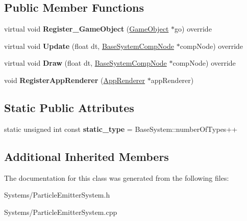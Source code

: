 \subsection*{Public Member Functions}
\begin{DoxyCompactItemize}
\item 
\mbox{\label{classParticleEmitterSystem_af96ef720b35ac0f5c3b64d7ecfdd7981}} 
virtual void {\bfseries Register\+\_\+\+Game\+Object} (\hyperlink{classGameObject}{Game\+Object} $\ast$go) override
\item 
\mbox{\label{classParticleEmitterSystem_a58c14c4c3318b2fe31e35c93789da998}} 
virtual void {\bfseries Update} (float dt, \hyperlink{structBaseSystemCompNode}{Base\+System\+Comp\+Node} $\ast$comp\+Node) override
\item 
\mbox{\label{classParticleEmitterSystem_afdc76f4da82b037339dac60955dc3834}} 
virtual void {\bfseries Draw} (float dt, \hyperlink{structBaseSystemCompNode}{Base\+System\+Comp\+Node} $\ast$comp\+Node) override
\item 
\mbox{\label{classParticleEmitterSystem_add279bc4259282ec0ea81cea790393ce}} 
void {\bfseries Register\+App\+Renderer} (\hyperlink{classAppRenderer}{App\+Renderer} $\ast$app\+Renderer)
\end{DoxyCompactItemize}
\subsection*{Static Public Attributes}
\begin{DoxyCompactItemize}
\item 
\mbox{\label{classParticleEmitterSystem_af81be45f022465f9e1b5c10efeb44f11}} 
static unsigned int const {\bfseries static\+\_\+type} = Base\+System\+::number\+Of\+Types++
\end{DoxyCompactItemize}
\subsection*{Additional Inherited Members}


The documentation for this class was generated from the following files\+:\begin{DoxyCompactItemize}
\item 
Systems/Particle\+Emitter\+System.\+h\item 
Systems/Particle\+Emitter\+System.\+cpp\end{DoxyCompactItemize}
